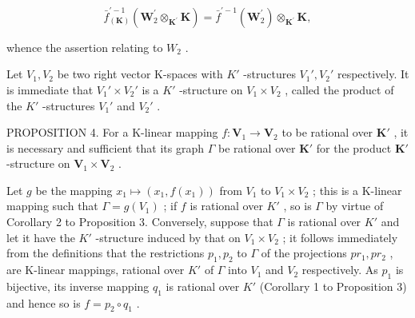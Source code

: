\[
\bar {f} _ {(\mathbf {K})} ^ {\prime - 1} (\mathbf {W} _ {2} ^ {\prime} \otimes_ {\mathbf {K} ^ {\prime}} \mathbf {K}) = \bar {f} ^ {\prime - 1} (\mathbf {W} _ {2} ^ {\prime}) \otimes_ {\mathbf {K} ^ {\prime}} \mathbf {K},
\]

whence the assertion relating to \(W_{2}\) .

Let \(V_{1}, V_{2}\) be two right vector K-spaces with \(K'\) -structures \(V_{1}', V_{2}'\) respectively. It is immediate that \(V_{1}' \times V_{2}'\) is a \(K'\) -structure on \(V_{1} \times V_{2}\) , called the product of the \(K'\) -structures \(V_{1}'\) and \(V_{2}'\) .

PROPOSITION 4. For a K-linear mapping \(f: \mathbf{V}_1 \to \mathbf{V}_2\) to be rational over \(\mathbf{K}'\) , it is necessary and sufficient that its graph \(\Gamma\) be rational over \(\mathbf{K}'\) for the product \(\mathbf{K}'\) -structure on \(\mathbf{V}_1 \times \mathbf{V}_2\) .

Let \(g\) be the mapping \(x_1 \mapsto (x_1, f(x_1))\) from \(V_1\) to \(V_1 \times V_2\) ; this is a K-linear mapping such that \(\Gamma = g(V_1)\) ; if \(f\) is rational over \(K'\) , so is \(\Gamma\) by virtue of Corollary 2 to Proposition 3. Conversely, suppose that \(\Gamma\) is rational over \(K'\) and let it have the \(K'\) -structure induced by that on \(V_1 \times V_2\) ; it follows immediately from the definitions that the restrictions \(p_1, p_2\) to \(\Gamma\) of the projections \(pr_1, pr_2\) , are K-linear mappings, rational over \(K'\) of \(\Gamma\) into \(V_1\) and \(V_2\) respectively. As \(p_1\) is bijective, its inverse mapping \(q_1\) is rational over \(K'\) (Corollary 1 to Proposition 3) and hence so is \(f = p_2 \circ q_1\) .

